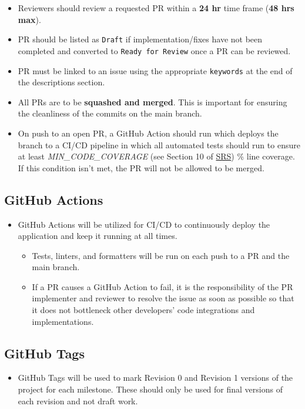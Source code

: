 \documentclass{article}
\begin{document}
\begin{itemize}
    \item Reviewers should review a requested PR within a \textbf{24 hr} time
    frame (\textbf{48 hrs max}).
    \item PR should be listed as \texttt{Draft} if implementation/fixes have not
    been completed and converted to \texttt{Ready for Review} once a PR can be
    reviewed.
    \item PR must be linked to an issue using the appropriate \texttt{keywords}
    at the end of the descriptions section.
    \item All PRs are to be \textbf{squashed and merged}. This is important for
    ensuring the cleanliness of the commits on the main branch.
    \item On push to an open PR, a GitHub Action should run which deploys the
    branch to a CI/CD pipeline in which all automated tests should run to ensure
    at least \textit{MIN\_CODE\_COVERAGE} (see Section 10 of
    \href{https://github.com/PlutosCapstone/Plutos/blob/main/docs/SRS/SRS.pdf}{SRS})
    \% line coverage. If this condition isn't met, the PR will not be allowed to
    be merged.
\end{itemize}

\subsection{GitHub Actions}
\begin{itemize}
    \item GitHub Actions will be utilized for CI/CD to continuously deploy the
    application and keep it running at all times.
    \begin{itemize}
        \item Tests, linters, and formatters will be run on each push to a PR
        and the main branch.
        \item If a PR causes a GitHub Action to fail, it is the responsibility
        of the PR implementer and reviewer to resolve the issue as soon as
        possible so that it does not bottleneck other developers' code
        integrations and implementations.
    \end{itemize}
\end{itemize}

\subsection{GitHub Tags}
\begin{itemize}
    \item GitHub Tags will be used to mark Revision 0 and Revision 1 versions of
    the project for each milestone. These should only be used for final versions
    of each revision and not draft work.
\end{itemize}
\end{document}
